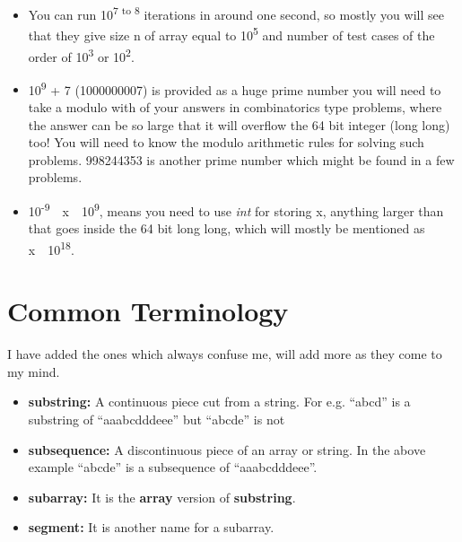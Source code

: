 \documentclass[13pt, oneside, a4paper]{book}
\begin{document}
\begin{itemize}
        \item You can run 10\textsuperscript{7 to 8} iterations in around one second, so
                mostly you will see that they give size n of array equal to 10\textsuperscript{5} 
                and number of test cases of the order of 10\textsuperscript{3} or 10\textsuperscript{2}.
        \item 10\textsuperscript{9} + 7 (1000000007) is provided as a huge prime number you will need
                to take a modulo with of your answers in combinatorics type problems, where the answer can be so large
                that it will overflow the 64 bit integer (long long) too! You will need to know the modulo
                arithmetic rules for solving such problems. 998244353 is another prime number which might be
                found in a few problems.
        \item 10\textsuperscript{-9}~\leq~x~\leq~10\textsuperscript{9}, means you need to use \textit{int} for storing x, anything
                larger than that goes inside the 64 bit long long, which will mostly be mentioned as x~\leq~10\textsuperscript{18}.
\end{itemize}

\section{Common Terminology}

I have added the ones which always confuse me, will add more as
they come to my mind.

\begin{itemize}
        \item \textbf{substring:} A continuous piece cut from a string. For e.g. ``abcd'' is a substring of ``aaabcdddeee'' but ``abcde'' is not
        \item \textbf{subsequence:} A discontinuous piece of an array or string. In the above example ``abcde'' is a subsequence of ``aaabcdddeee''.
        \item \textbf{subarray:} It is the \textbf{array} version of \textbf{substring}.
        \item \textbf{segment:} It is another name for a subarray.
\end{itemize}
\end{document}
